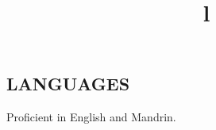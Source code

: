 \documentclass[margin]{res}
\begin{document}
\begin{resume}
\section{LANGUAGES}
Proficient in English and Mandrin.

\begin{format}
\title{l}\\
\\
\body\\
\end{format}





%






\end{resume}
\(\)
\end{document}
